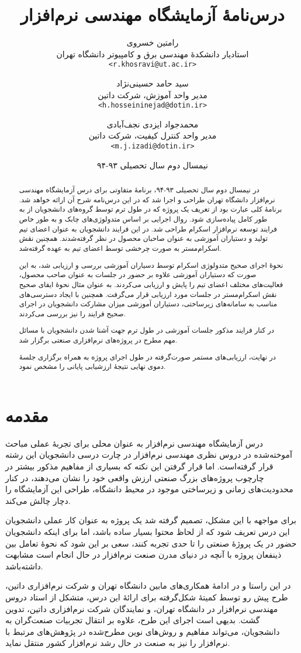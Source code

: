 \documentclass[a4paper,notitlepage]{report}
\title{درس‌نامهٔ آزمایشگاه مهندسی نرم‌افزار}
\author{
رامتین خسروی\\\small{استادیار دانشکدهٔ مهندسی برق و کامپیوتر دانشگاه تهران}\\
\small\texttt{<r.khosravi@ut.ac.ir>}\and
سید حامد حسینی‌نژاد\\\small{مدیر واحد آموزش، شرکت داتین}\\
\small\texttt{<h.hosseininejad@dotin.ir>}\and
محمدجواد ایزدی نجف‌آبادی\\\small{مدیر واحد کنترل کیفیت، شرکت داتین}\\
\small\texttt{<m.j.izadi@dotin.ir>}
}
\date{نیمسال دوم سال تحصیلی ۹۳-۹۴}
\begin{document}
\maketitle
\tableofcontents
\begin{abstract}
در نیمسال دوم سال تحصیلی ۹۳-۹۴، برنامهٔ متفاوتی برای درس آزمایشگاه مهندسی نرم‌افزار دانشگاه تهران طراحی و اجرا شد
که در این درس‌نامه شرح آن ارائه خواهد شد.
برنامهٔ کلی عبارت بود از تعریف یک پروژه که در طول ترم توسط گروه‌های دانشجویان از به طور کامل پیاده‌سازی شود.
روال اجرایی بر اساس متدولوژی‌های چابک و به طور خاص فرایند توسعه نرم‌افزار اسکرام طراحی شد.
در این فرایند دانشجویان به عنوان اعضای تیم تولید و دستیاران آموزشی به عنوان صاحبان محصول در نظر گرفته‌شدند.
همچنین نقش اسکرام‌مستر به صورت چرخشی توسط اعضای تیم به عهده گرفته‌شد.

نحوهٔ اجرای صحیح متدولوژی اسکرام توسط دسیاران آموزشی بررسی و ارزیابی شد،
به این صورت که دستیاران آموزشی علاوه بر حضور در جلسات به عنوان صاحب محصول، فعالیت‌های مختلف اعضای تیم را پایش و ارزیابی می‌کردند.
به عنوان مثال نحوهٔ ایفای صحیح نقش اسکرام‌مستر در جلسات مورد ارزیابی قرار می‌گرفت.
همچنین با ایجاد دسترسی‌های مناسب به سامانه‌های زیرساختی، دستیاران آموزشی میزان مشارکت دانشجویان در اجرای صحیح فرایند را نیز بررسی می‌کردند.

در کنار فرایند مذکور جلسات آموزشی در طول ترم جهت آشنا شدن دانشجویان با مسائل مهم مطرح در پروژه‌های نرم‌افزاری صنعتی برگزار شد.

در نهایت، ارزیابی‌های مستمر صورت‌گرفته در طول اجرای پروژه به همراه برگزاری جلسهٔ دموی نهایی نتیجهٔ ارزشیابی پایانی را مشخص نمود.
\end{abstract}
\chapter{مقدمه}
درس آزمایشگاه مهندسی نرم‌افزار به عنوان محلی برای تجربهٔ عملی مباحث آموخته‌شده در دروس نظری مهندسی نرم‌افزار در چارت درسی دانشجویان این رشته قرار گرفته‌است.
اما قرار گرفتن این نکته که بسیاری از مفاهیم مذکور بیشتر در چارچوب پروژه‌های بزرگ صنعتی ارزش واقعی خود را نشان می‌دهند، 
در کنار محدودیت‌های زمانی و زیرساختی موجود در محیط دانشگاه، طراحی این آزمایشگاه را دچار چالش می‌کند.

برای مواجهه با این مشکل، تصمیم گرفته شد یک پروژه به عنوان کار عملی دانشجویان این درس تعریف شود که از لحاظ محتوا بسیار ساده باشد،
اما برای اینکه  دانشجویان حضور در یک پروژهٔ صنعتی را تا حدی تجربه کنند، سعی بر این شود که نحوهٔ تعامل بین ذینفعان پروژه
با آنچه در دنیای مدرن صنعت نرم‌افزار در حال انجام است مشابهت داشته‌باشد.


در این راستا و در ادامهٔ همکاری‌های مابین دانشگاه تهران و شرکت نرم‌افزاری داتین، طرح پیش رو توسط کمیتهٔ شکل‌گرفته برای ارائهٔ این درس،
متشکل از استاد دروس مهندسی نرم‌افزار در دانشگاه تهران، و نمایندگان شرکت نرم‌افزاری داتین، تدوین گشت.
بدیهی است اجرای این طرح، علاوه بر  انتقال تجربیات صنعت‌گران به دانشجویان، می‌تواند مفاهیم و روش‌های نوین مطرح‌شده در پژوهش‌های مرتبط با نرم‌افزار را نیز
به صنعت در حال رشد نرم‌افزار کشور منتقل نماید.
\end{document}

